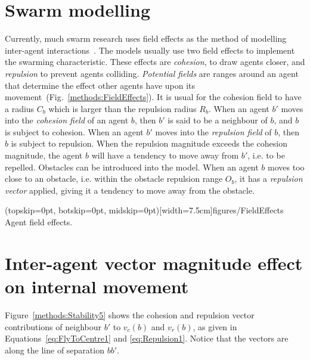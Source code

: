 \documentclass{ieeeaccess}
\begin{document}
\section{Swarm modelling}\label{Section:SwarmModelling}
Currently, much swarm research uses field effects as the method of modelling
inter-agent interactions~\cite{BAF:06, BAFVM:06, BM:09, APZDAMC:09, GP:02,
GP:04, GP:04a, GP:05, GP:11, MYP:09}. The models usually use two field effects
to implement the swarming characteristic. These effects are \textit{cohesion},
to draw agents closer, and \textit{repulsion} to prevent agents colliding.
\textit{Potential fields} are ranges around an agent that determine the effect
other agents have upon its movement~(Fig.~\ref{methods:FieldEffects}). It is
usual for the cohesion field to have a radius $C_b$ which is larger than the
repulsion radius $R_b$. When an agent $b'$ moves into the \textit{cohesion
field} of an agent $b$, then $b'$ is said to be a neighbour of $b$, and $b$ is
subject to cohesion. When an agent $b'$ moves into the \textit{repulsion field}
of $b$, then $b$ is subject to repulsion. When the repulsion magnitude exceeds
the cohesion magnitude, the agent $b$ will have a tendency to move away from
$b'$, i.e. to be repelled. Obstacles can be introduced into the model. When an
agent $b$ moves too close to an obstacle, i.e. within the obstacle repulsion
range $O_b$, it has a \textit{repulsion vector} applied, giving it a tendency
to move away from the obstacle.

\Figure[t!](topskip=0pt, botskip=0pt, midskip=0pt)[width=7.5cm]{figures/FieldEffects}
{Agent field effects.\label{methods:FieldEffects}}


\section{Inter-agent vector magnitude effect on internal movement}\label{Section:StabilityMagnitude}
Figure~\ref{methods:Stability5} shows the cohesion and repulsion vector
contributions of neighbour $b'$ to $v_c(b)$ and $v_r(b)$, as given in
Equations~\ref{eq:FlyToCentre1} and \ref{eq:Repulsion1}. Notice that the vectors
are along the line of separation $bb'$. \\
\end{document}
